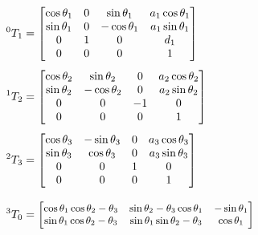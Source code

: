 \begin{align}
    ^0T_1 & =
    \begin{bmatrix}
        \cos{\theta_{1}} & 0 & \sin{\theta_{1}}   & a_{1} \cos{\theta_{1}} \\
        \sin{\theta_{1}} & 0 & - \cos{\theta_{1}} & a_{1} \sin{\theta_{1}} \\
        0                & 1 & 0                  & d_{1}                  \\
        0                & 0 & 0                  & 1                      \\
    \end{bmatrix}\label{eq:t01} \\[1ex]
    ^1T_2 & =
    \begin{bmatrix}
        \cos{\theta_{2}} & \sin{\theta_{2}}   & 0  & a_{2} \cos{\theta_{2}} \\
        \sin{\theta_{2}} & - \cos{\theta_{2}} & 0  & a_{2} \sin{\theta_{2}} \\
        0                & 0                  & -1 & 0                      \\
        0                & 0                  & 0  & 1                      \\
    \end{bmatrix}\label{eq:t12} \\[1ex]
    ^2T_3 & =
    \begin{bmatrix}
        \cos{\theta_{3}} & - \sin{\theta_{3}} & 0 & a_{3} \cos{\theta_{3}} \\
        \sin{\theta_{3}} & \cos{\theta_{3}}   & 0 & a_{3} \sin{\theta_{3}} \\
        0                & 0                  & 1 & 0                      \\
        0                & 0                  & 0 & 1                      \\
    \end{bmatrix}\label{eq:t23} \\[2ex]
    ^3T_0 & =
    {\small\begin{bmatrix}
        \cos{\theta_{1}} \cos{\theta_{2} - \theta_{3}} & \sin{\theta_{2} - \theta_{3}} \cos{\theta_{1}}                                                                    & - \sin{\theta_{1}} \\
        \sin{\theta_{1}} \cos{\theta_{2} - \theta_{3}} & \sin{\theta_{1}} \sin{\theta_{2} - \theta_{3}}                                                                    & \cos{\theta_{1}}   \\

\end{bmatrix}}
\end{align}
